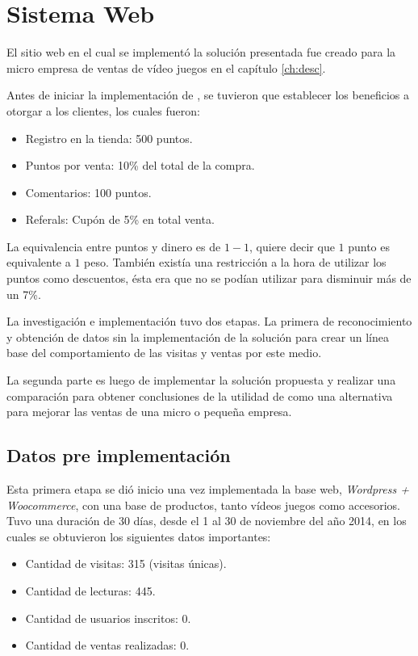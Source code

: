 \section{Sistema Web}
\label{cap_estudio}

El sitio web en el cual se implementó la solución presentada fue creado para la micro empresa de
ventas de vídeo juegos en el capítulo \ref{ch:desc}.

Antes de iniciar la implementación de {\gam}, se tuvieron que establecer los beneficios a otorgar a los 
clientes, los cuales fueron:

\begin{itemize}

\item Registro en la tienda: 500 puntos.
\item Puntos por venta: 10\% del total de la compra.
\item Comentarios: 100 puntos.
\item Referals: Cupón de 5\% en total venta.

\end{itemize}

La equivalencia entre puntos y dinero es de $1-1$, quiere decir que $1$ punto es equivalente a 
$1$ peso. También existía una restricción a la hora de utilizar los puntos como descuentos, ésta 
era que no se podían utilizar para disminuir más de un 7\%.

La investigación e implementación tuvo dos etapas. La primera de reconocimiento y obtención de datos
 sin la implementación de la solución para crear un línea base del comportamiento de las visitas 
y ventas por este medio.

La segunda parte es luego de implementar la solución
propuesta y realizar una comparación para obtener conclusiones de la utilidad de
{\gam} como una alternativa para mejorar las ventas de una micro o pequeña empresa.

\subsection{Datos pre implementación {\gam}}

Esta primera etapa se dió inicio una vez implementada la base web,
\emph{Wordpress + Woocommerce}, con una base de productos, tanto vídeos juegos como
accesorios.
Tuvo una duración de 30 días, desde el 1 al 30 de noviembre del año 2014,
en los cuales se obtuvieron los siguientes datos importantes:


\begin{itemize}
    \item Cantidad de visitas: 315 (visitas únicas).
    \item Cantidad de lecturas: 445.
    \item Cantidad de usuarios inscritos: 0.
    \item Cantidad de ventas realizadas: 0.
\end{itemize}

